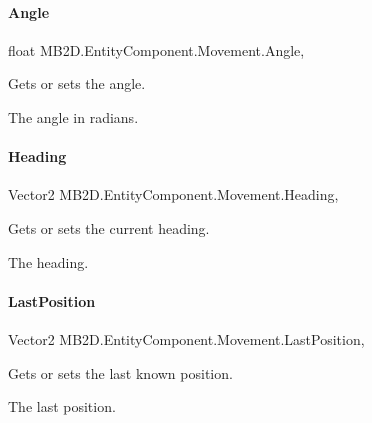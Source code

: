 \paragraph{\texorpdfstring{Angle}{Angle}}
{\footnotesize\ttfamily float M\+B2\+D.\+Entity\+Component.\+Movement.\+Angle\hspace{0.3cm}{\ttfamily [get]}, {\ttfamily [set]}}



Gets or sets the angle. 

The angle in radians.\hypertarget{class_m_b2_d_1_1_entity_component_1_1_movement_adeedf6c11648bd487a6a7e75cc7848e3}{}\label{class_m_b2_d_1_1_entity_component_1_1_movement_adeedf6c11648bd487a6a7e75cc7848e3} 
\paragraph{\texorpdfstring{Heading}{Heading}}
{\footnotesize\ttfamily Vector2 M\+B2\+D.\+Entity\+Component.\+Movement.\+Heading\hspace{0.3cm}{\ttfamily [get]}, {\ttfamily [set]}}



Gets or sets the current heading. 

The heading.\hypertarget{class_m_b2_d_1_1_entity_component_1_1_movement_aa9fc1e316492a6b72084d5c7f88786e7}{}\label{class_m_b2_d_1_1_entity_component_1_1_movement_aa9fc1e316492a6b72084d5c7f88786e7} 
\paragraph{\texorpdfstring{Last\+Position}{LastPosition}}
{\footnotesize\ttfamily Vector2 M\+B2\+D.\+Entity\+Component.\+Movement.\+Last\+Position\hspace{0.3cm}{\ttfamily [get]}, {\ttfamily [set]}}



Gets or sets the last known position. 

The last position.\hypertarget{class_m_b2_d_1_1_entity_component_1_1_movement_a7b94bcfe9d86cd611ef0c5b4afe6b426}{}\label{class_m_b2_d_1_1_entity_component_1_1_movement_a7b94bcfe9d86cd611ef0c5b4afe6b426} 
